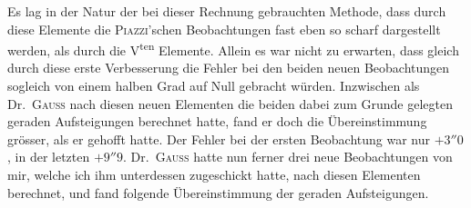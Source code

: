 \begin{center}
\begingroup\small\setlength{\tabcolsep}{2pt}
\ifdim\wd0>\linewidth\resizebox{\linewidth}{!}{\usebox{0}}\else\usebox{0}\fi
\endgroup
\end{center}
Es lag in der Natur der bei dieser Rechnung gebrauchten Methode, dass durch diese Elemente die \textsc{Piazzi}'schen Beobachtungen fast eben so scharf dargestellt werden, als durch die V\textsuperscript{ten} Elemente. Allein es war nicht zu erwarten, dass gleich durch diese erste Verbesserung die Fehler bei den beiden neuen Beobachtungen sogleich von einem halben Grad auf Null gebracht würden. Inzwischen als Dr.\ \textsc{Gauss} nach diesen neuen Elementen die beiden dabei zum Grunde gelegten geraden Aufsteigungen berechnet hatte, fand er doch die Übereinstimmung grösser, als er gehofft hatte. Der Fehler bei der ersten Beobachtung war nur $+3''0$, in der letzten $+9''9$. Dr.\ \textsc{Gauss} hatte nun ferner drei neue Beobachtungen von mir, welche ich ihm unterdessen zugeschickt hatte, nach diesen Elementen berechnet, und fand folgende Übereinstimmung der geraden Aufsteigungen.
